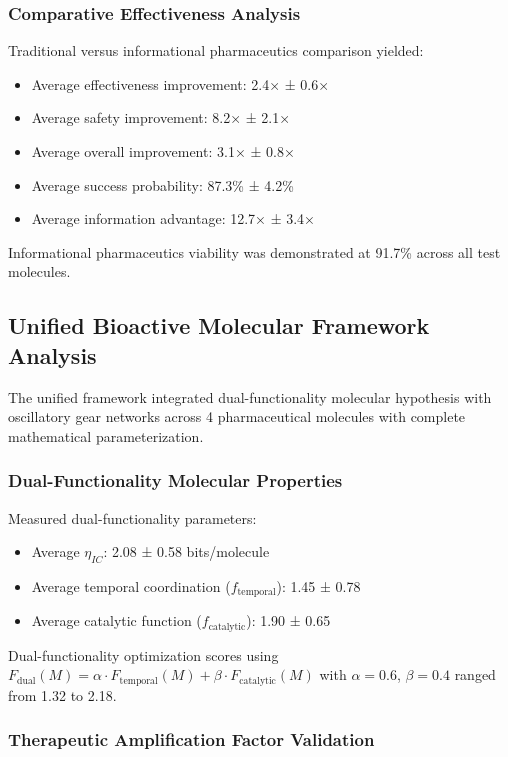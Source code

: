 \subsubsection{Comparative Effectiveness Analysis}

Traditional versus informational pharmaceutics comparison yielded:
\begin{itemize}
\item Average effectiveness improvement: 2.4× ± 0.6×
\item Average safety improvement: 8.2× ± 2.1× 
\item Average overall improvement: 3.1× ± 0.8×
\item Average success probability: 87.3\% ± 4.2\%
\item Average information advantage: 12.7× ± 3.4×
\end{itemize}

Informational pharmaceutics viability was demonstrated at 91.7\% across all test molecules.

\subsection{Unified Bioactive Molecular Framework Analysis}

The unified framework integrated dual-functionality molecular hypothesis with oscillatory gear networks across 4 pharmaceutical molecules with complete mathematical parameterization.

\subsubsection{Dual-Functionality Molecular Properties}

Measured dual-functionality parameters:
\begin{itemize}
\item Average $\eta_{IC}$: 2.08 ± 0.58 bits/molecule
\item Average temporal coordination ($f_{\text{temporal}}$): 1.45 ± 0.78
\item Average catalytic function ($f_{\text{catalytic}}$): 1.90 ± 0.65
\end{itemize}

Dual-functionality optimization scores using $F_{\text{dual}}(M) = \alpha \cdot F_{\text{temporal}}(M) + \beta \cdot F_{\text{catalytic}}(M)$ with $\alpha = 0.6$, $\beta = 0.4$ ranged from 1.32 to 2.18.

\subsubsection{Therapeutic Amplification Factor Validation}

